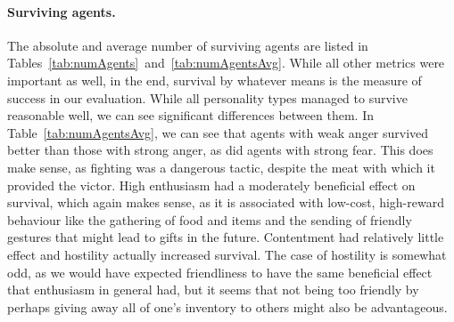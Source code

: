 \paragraph{Surviving agents.} The absolute and average number of surviving agents are listed in Tables~\ref{tab:numAgents}~and~\ref{tab:numAgentsAvg}. While all other metrics were important as well, in the end, survival by whatever means is the measure of success in our evaluation. While all personality types managed to survive reasonable well, we can see significant differences between them. In Table~\ref{tab:numAgentsAvg}, we can see that agents with weak anger survived better than those with strong anger, as did agents with strong fear. This does make sense, as fighting was a dangerous tactic, despite the meat with which it provided the victor. High enthusiasm had a moderately beneficial effect on survival, which again makes sense, as it is associated with low-cost, high-reward behaviour like the gathering of food and items and the sending of friendly gestures that might lead to gifts in the future. Contentment had relatively little effect and hostility actually increased survival. The case of hostility is somewhat odd, as we would have expected friendliness to have the same beneficial effect that enthusiasm in general had, but it seems that not being too friendly by perhaps giving away all of one's inventory to others might also be advantageous.

